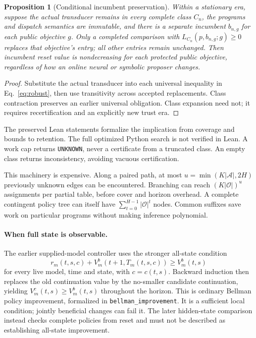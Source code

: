 \documentclass[10pt,twocolumn]{article}
\newtheorem{proposition}{Proposition}
\newcommand{\code}[1]{\texttt{\small #1}}
\begin{document}
\begin{proposition}[Conditional incumbent preservation]\label{prop:incumbent}
Within a stationary era, suppose the actual transducer remains in every
complete class $C_n$, the programs and dispatch semantics are immutable, and
there is a separate incumbent $b_{n,g}$ for each public objective $g$.
Only a completed comparison with $L_{C_n}(p,b_{n,g};g)\geq0$ replaces that
objective's entry; all other entries remain unchanged. Then incumbent reset
value is nondecreasing for each protected public objective,
regardless of how an online neural or symbolic proposer changes.
\end{proposition}
\begin{proof}
Substitute the actual transducer into each universal inequality in
Eq.~\eqref{eq:robust}, then use transitivity across accepted replacements.
Class contraction preserves an earlier universal obligation. Class expansion
need not; it requires recertification and an explicitly new trust era.
\end{proof}
The preserved Lean statements formalize the implication from coverage and
bounds to retention. The full optimized Python search is not verified in Lean.
A work cap returns \code{UNKNOWN}, never a certificate from a truncated class.
An empty class returns inconsistency, avoiding vacuous certification.

This machinery is expensive. Along a paired path, at most
$u=\min(K|\mathcal A|,2H)$ previously unknown edges can be encountered.
Branching can reach $(K|\mathcal O|)^u$ assignments per partial table, before
cover and horizon overhead. A complete contingent policy tree can itself have
$\sum_{t=0}^{H-1}|\mathcal O|^t$ nodes. Common suffixes save work on particular
programs without making inference polynomial.

\paragraph{When full state is observable.}
The earlier supplied-model controller uses the stronger all-state condition
\begin{equation}
 r_m(t,s,c)+V_m^b(t+1,T_m(t,s,c))\geq V_m^b(t,s)
\end{equation}
for every live model, time and state, with $c=c(t,s)$. Backward induction then
replaces the old continuation value by the no-smaller candidate continuation,
yielding $V_m^c(t,s)\geq V_m^b(t,s)$ throughout the horizon. This is ordinary
Bellman policy improvement, formalized in \code{bellman\_improvement}. It is a
sufficient local condition; jointly beneficial changes can fail it. The later
hidden-state comparison instead checks complete policies from reset and must
not be described as establishing all-state improvement.
\end{document}
